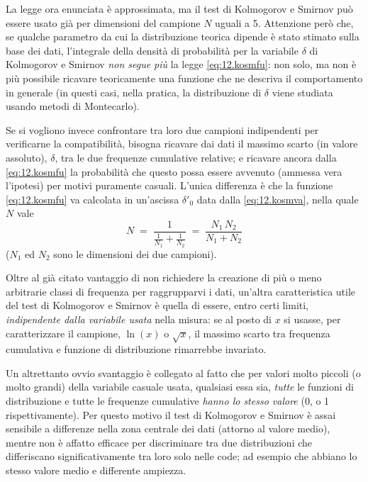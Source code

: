 La legge ora enunciata \`e approssimata, ma il test di
Kolmogorov e Smirnov pu\`o essere usato gi\`a per dimensioni
del campione $N$ uguali a 5.  Attenzione per\`o che, se
qualche parametro da cui la distribuzione teorica dipende
\`e stato stimato sulla base dei dati, l'integrale della
densit\`a di probabilit\`a per la variabile $\delta$ di
Kolmogorov e Smirnov \emph{non segue pi\`u} la legge
\eqref{eq:12.kosmfu}: non solo, ma non \`e pi\`u possibile
ricavare teoricamente una funzione che ne descriva il
comportamento in generale (in questi casi, nella pratica, la
distribuzione di $\delta$ viene studiata usando metodi di
Montecarlo).

Se si vogliono invece confrontare tra loro due campioni
indipendenti per verificarne la compatibilit\`a, bisogna
ricavare dai dati il massimo scarto (in valore assoluto),
$\delta$, tra le due frequenze cumulative relative; e
ricavare ancora dalla \eqref{eq:12.kosmfu} la probabilit\`a
che questo possa essere avvenuto (ammessa vera l'ipotesi)
per motivi puramente casuali.  L'unica differenza \`e che la
funzione \eqref{eq:12.kosmfu} va calcolata in un'ascissa
$\delta'_0$ data dalla \eqref{eq:12.kosmva}, nella quale $N$
vale
\begin{equation*}
  N \; = \; \frac{1}{\frac{1}{N_1} + \frac{1}{N_2}} \; = \;
  \frac{N_1 \, N_2}{N_1 + N_2}
\end{equation*}
($N_1$ ed $N_2$ sono le dimensioni dei due campioni).

Oltre al gi\`a citato vantaggio di non richiedere la
creazione di pi\`u o meno arbitrarie classi di frequenza per
raggrupparvi i dati, un'altra caratteristica utile del test
di Kolmogorov e Smirnov \`e quella di essere, entro certi
limiti, \emph{indipendente dalla variabile usata} nella
misura: se al posto di $x$ si usasse, per caratterizzare il
campione, $\ln(x)$ o $\sqrt{x}$, il massimo scarto tra
frequenza cumulativa e funzione di distribuzione rimarrebbe
invariato.

Un altrettanto ovvio svantaggio \`e collegato al fatto che
per valori molto piccoli (o molto grandi) della variabile
casuale usata, qualsiasi essa sia, \emph{tutte} le funzioni
di distribuzione e tutte le frequenze cumulative \emph{hanno
  lo stesso valore} (0, o 1 rispettivamente).  Per questo
motivo il test di Kolmogorov e Smirnov \`e assai sensibile a
differenze nella zona centrale dei dati (attorno al valore
medio), mentre non \`e affatto efficace per discriminare tra
due distribuzioni che differiscano significativamente tra
loro solo nelle code; ad esempio che abbiano lo stesso
valore medio e differente ampiezza.%
%
%

\endinput
